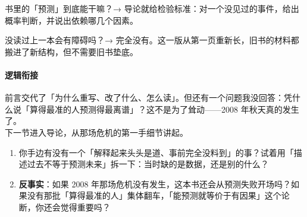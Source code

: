 \documentclass[../main2.tex]{subfiles}
\begin{document}
\begin{reader_anticipation}
	\item 书里的「预测」到底能干嘛？→ 导论就给检验标准：对一个没见过的事件，给出概率判断，并说出依赖哪几个因素。
	\item 没读过上一本会有障碍吗？→ 完全没有。这一版从第一页重新长，旧书的材料都搬进了新结构，但不需要旧书垫底。
\end{reader_anticipation}

\paragraph*{逻辑衔接}
	前言交代了「为什么重写、改了什么、怎么读」。但还有一个问题我没回答：凭什么说「算得最准的人预测得最离谱」？这不是为了耸动——2008 年秋天真的发生了。\\
	下一节进入导论，从那场危机的第一手细节讲起。

\begin{thinkbox}
\begin{enumerate}
	\item 你手边有没有一个「解释起来头头是道、事前完全没料到」的事？试着用「描述过去不等于预测未来」拆一下：当时缺的是数据，还是别的什么？
	\item \textbf{反事实}：如果 2008 年那场危机没有发生，这本书还会从预测失败开场吗？如果没有那批「算得最准的人」集体翻车，「能预测就等价于有因果」这个论断，你还会觉得重要吗？
\end{enumerate}
\end{thinkbox}
\end{document}
